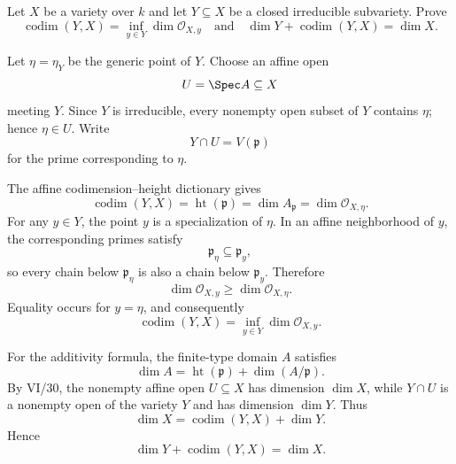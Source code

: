 \begin{problem}\label{prob:vi31-01}
Let \(X\) be a variety over \(k\) and let \(Y\subseteq X\) be a closed irreducible subvariety. Prove
\[
\operatorname{codim}(Y,X)=\inf_{y\in Y}\dim\mathcal O_{X,y}
\quad\text{and}\quad
\dim Y+\operatorname{codim}(Y,X)=\dim X.
\]

\end{problem}

\ifdefined\FullProblemDossiers
\begin{solution}
Let \(\eta=\eta_Y\) be the generic point of \(Y\). Choose an affine open
\[
U=\Spec A\subseteq X
\]
meeting \(Y\). Since \(Y\) is irreducible, every nonempty open subset of \(Y\) contains \(\eta\); hence
\(\eta\in U\). Write
\[
Y\cap U=V(\mathfrak p)
\]
for the prime corresponding to \(\eta\).

The affine codimension--height dictionary gives
\[
\operatorname{codim}(Y,X)
=
\operatorname{ht}(\mathfrak p)
=
\dim A_{\mathfrak p}
=
\dim\mathcal O_{X,\eta}.
\]
For any \(y\in Y\), the point \(y\) is a specialization of \(\eta\). In an affine neighborhood of \(y\), the
corresponding primes satisfy
\[
\mathfrak p_\eta\subseteq\mathfrak p_y,
\]
so every chain below \(\mathfrak p_\eta\) is also a chain below \(\mathfrak p_y\). Therefore
\[
\dim\mathcal O_{X,y}\ge\dim\mathcal O_{X,\eta}.
\]
Equality occurs for \(y=\eta\), and consequently
\[
\boxed{
\operatorname{codim}(Y,X)
=
\inf_{y\in Y}\dim\mathcal O_{X,y}.
}
\]

For the additivity formula, the finite-type domain \(A\) satisfies
\[
\dim A
=
\operatorname{ht}(\mathfrak p)
+
\dim(A/\mathfrak p).
\]
By VI/30, the nonempty affine open \(U\subseteq X\) has dimension \(\dim X\), while
\(Y\cap U\) is a nonempty open of the variety \(Y\) and has dimension \(\dim Y\). Thus
\[
\dim X
=
\operatorname{codim}(Y,X)+\dim Y.
\]
Hence
\[
\boxed{\dim Y+\operatorname{codim}(Y,X)=\dim X}.
\]
\end{solution}
\fi

